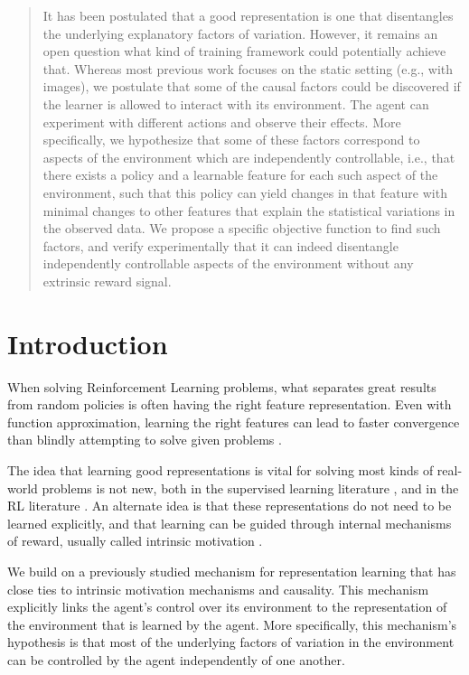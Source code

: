 \begin{abstract}
    It has been postulated that a good representation is one that disentangles the underlying explanatory factors of variation. However, it remains an open question what kind of training framework could potentially achieve that. Whereas most previous work focuses on the static setting (e.g., with images), we postulate that some of the causal factors could be discovered if the learner is allowed to interact with its environment. The agent can experiment with different actions and observe their effects. More specifically, we hypothesize that some of these factors correspond to aspects of the environment which are independently controllable, i.e., that there exists a policy and a learnable feature for each such aspect of the environment, such that this policy can yield changes in that feature with minimal changes to other features that explain the statistical variations in the observed data. We propose a specific objective function to find such factors, and verify experimentally that it can indeed disentangle independently controllable aspects of the environment without any extrinsic reward signal.

\end{abstract}


\section{Introduction}

When solving Reinforcement Learning problems, what separates great results from random policies is often having the right feature representation. Even with function approximation, learning the right features can lead to faster convergence than blindly attempting to solve given problems \citep{jaderberg2016reinforcement}.

The idea that learning good representations is vital for solving most kinds of real-world problems is not new, both in the supervised learning literature \citep{Bengio-2009-book,Goodfellow-et-al-2016}, and in the RL literature \citep{dayan1993improving,precup2000temporal}. An alternate idea is that these representations do not need to be learned explicitly, and that learning can be guided through internal mechanisms of reward, usually called intrinsic motivation \citep{barto2004intrinsically,oudeyer2009intrinsic,salge2013empowerment, varintcontrol}. 

We build on a previously studied \citep{thomas2017independently} mechanism for representation learning that has close ties to intrinsic motivation mechanisms and causality. This mechanism explicitly links the agent's control over its environment to the representation of the environment that is learned by the agent. More specifically, this mechanism's hypothesis is that most of the underlying factors of variation in the environment can be controlled by the agent independently of one another. %

